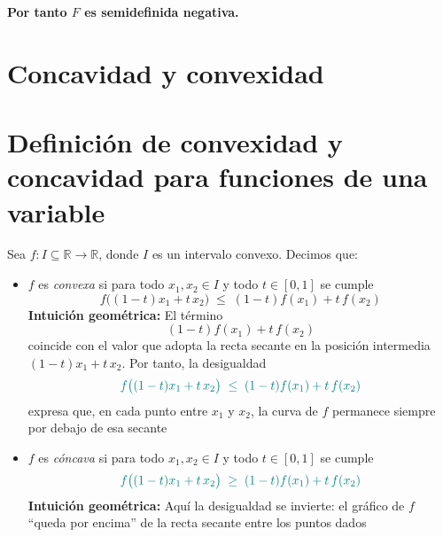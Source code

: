\documentclass{article}
\begin{document}
\textbf{\color{teal}Por tanto \(F\) es semidefinida negativa. 
}

\newpage
\section{Concavidad y convexidad}

\section*{Definición de convexidad y concavidad para funciones de una variable}

Sea \(f\colon I\subseteq\mathbb{R}\to\mathbb{R}\), donde \(I\) es un intervalo convexo. Decimos que:
\begin{itemize}
  \item \(f\) es \emph{convexa} si para todo \(x_{1},x_{2}\in I\) y todo \(t\in[0,1]\) se cumple
    \[
      f\bigl((1-t)x_{1} + t\,x_{2}\bigr)
      \;\le\;
      (1-t)f(x_{1}) + t\,f(x_{2})
    \]
    \noindent\textbf{Intuición geométrica:} El término
    \[
      (1-t)f(x_{1}) + t\,f(x_{2})
    \]
    coincide con el valor que adopta la recta secante en la posición intermedia 
    \((1-t)x_{1}+t\,x_{2}\).  
    Por tanto, la desigualdad
    \[
      \color{teal}
      f\bigl((1-t)x_{1} + t\,x_{2}\bigr)
      \;\le\;
      (1-t)f(x_{1}) + t\,f(x_{2})
    \]
    expresa que, en cada punto entre \(x_1\) y \(x_2\), la curva de \(f\) permanece siempre por debajo de esa secante

  \item \(f\) es \emph{cóncava} si para todo \(x_{1},x_{2}\in I\) y todo \(t\in[0,1]\) se cumple
    \[
      \color{teal}
      f\bigl((1-t)x_{1} + t\,x_{2}\bigr)
      \;\ge\;
      (1-t)f(x_{1}) + t\,f(x_{2})
    \]
    \noindent\textbf{Intuición geométrica:} Aquí la desigualdad se invierte: el gráfico de \(f\) “queda por encima” de la recta secante entre los puntos dados
\end{itemize}
\end{document}
